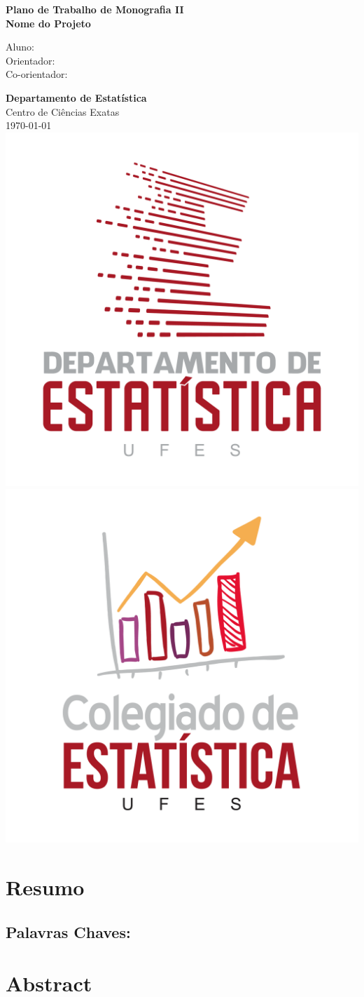\documentclass[12pt]{article}
\begin{document}
\begin{titlepage}
\begin{flushright}
\LARGE{\textbf{Plano de Trabalho de Monografia II}}\\
\vfill
\Huge{\textbf{Nome do Projeto}}\\
    \vfill

    \large Aluno: \\
    \large Orientador: \\
    \large Co-orientador: \\
\vfill

\textbf{Departamento de Estatística}\\
Centro de Ciências Exatas\\
\today
\vfill
\includegraphics[width=0.25\linewidth]{LogoDeptEstatistica_final.png}\hspace{6,5cm}
\includegraphics[width=0.25\linewidth]{Logo_COLEST.png}\\ 
\end{flushright}
\end{titlepage}

\section*{Resumo}

\subsection*{Palavras Chaves: }

\section*{Abstract}
\end{document}
